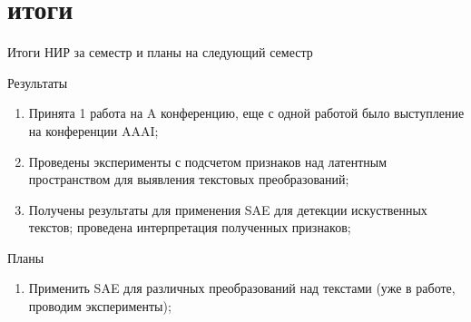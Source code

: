 \documentclass{beamer}
\begin{document}
\section{итоги}
\begin{frame}{Итоги НИР за семестр и планы на следующий семестр}
    \begin{block}{Результаты}
    \begin{enumerate}
        \item Принята 1 работа на A конференцию, еще с одной работой было выступление на конференции AAAI;
        \item Проведены эксперименты с подсчетом признаков над латентным пространством для выявления текстовых преобразований;
        \item Получены результаты для применения SAE для детекции искуственных текстов; проведена интерпретация полученных признаков;
    \end{enumerate}
    \end{block}

    \begin{block}{Планы}
    \begin{enumerate}
        \item Применить SAE для различных преобразований над текстами (уже в работе, проводим эксперименты);
    \end{enumerate}
    \end{block}
    
\end{frame}

\end{document}
